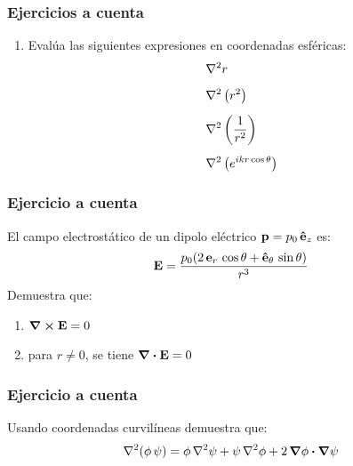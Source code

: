 \documentclass[12pt]{beamer}
\begin{document}
\begin{frame}
\frametitle{Ejercicios a cuenta}
\begin{enumerate}[<+->]
\conti
\item Evalúa las siguientes expresiones en coordenadas esféricas:
\begin{align*}
&\laplacian{r} \\[0.5em]
&\laplacian{\left( r^{2} \right)} \\[0.5em]
&\laplacian{\left( \dfrac{1}{r^{2}} \right)} \\[0.5em]
&\laplacian{\left( e^{i k r \cos \theta} \right)}
\end{align*}
\end{enumerate}
\end{frame}
\begin{frame}
\frametitle{Ejercicio a cuenta}
El campo electrostático de un dipolo eléctrico $\vb{p} = p_{0} \, \vu{e}_{z}$ es:
\begin{align*}
\vb{E} = \dfrac{p_{0} (2 \, \vb{e}_{r} \, \cos \theta + \vu{e}_{\theta} \, \sin \theta)}{r^{3}}
\end{align*}
Demuestra que:
\begin{enumerate}
\item $\curl{\vb{E}} = 0$
\item para $r \neq 0$, se tiene $\div{\vb{E}} = 0$
\end{enumerate}
\end{frame}
\begin{frame}
\frametitle{Ejercicio a cuenta}
Usando coordenadas curvilíneas demuestra que:
\begin{align*}
\laplacian{(\phi \, \psi)} = \phi \, \laplacian{\psi} + \psi \, \laplacian{\phi} + 2 \, \grad{\phi} \vdot \grad{\psi}
\end{align*}
\end{frame}
\end{document}
